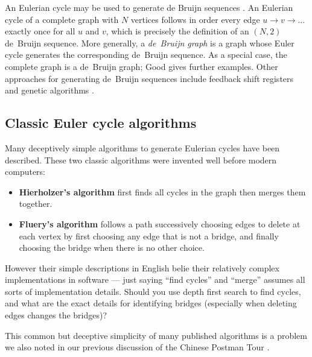 \documentclass[preprint,times]{elsarticle}
\begin{document}
An Eulerian cycle may be used to generate de Bruijn sequences \cite{fleury,hierholzer}. An Eulerian cycle of a complete graph with $N$ vertices follows in order every edge $u \rightarrow v \rightarrow\ldots$ exactly once for all $u$ and $v$, which is precisely the definition of an $(N,2)$ de~Bruijn sequence. More generally, a \emph{de~Bruijn graph\/} is a graph whose Euler cycle generates the corresponding de~Bruijn sequence. As a special case, the complete graph is a de~Bruijn graph; Good \cite{good} gives further examples. Other approaches for generating de~Bruijn sequences include feedback shift registers and genetic algorithms \cite{turan,knuth4a}.%

\subsection{Classic Euler cycle algorithms}\label{new-algorithm}
Many deceptively simple algorithms to generate Eulerian cycles have been described. These two classic algorithms were invented well before modern computers:

\begin{itemize}\raggedright
\item \textbf{Hierholzer's algorithm} \cite{hierholzer} first finds all cycles in the graph then merges them together. 
\item \textbf{Fluery's algorithm} \cite{fleury} follows a path successively choosing edges to delete at each vertex by first choosing any edge that is not a bridge, and finally choosing the bridge when there is no other choice.
\end{itemize}

However their simple descriptions in English belie their relatively complex implementations in software --- just saying ``find cycles'' and ``merge'' assumes all sorts of implementation details. Should you use depth first search to find cycles, and what are the exact details for identifying bridges (especially when deleting edges changes the bridges)? 

This common but deceptive simplicity of many published algorithms is a problem we also noted in our previous discussion of the Chinese Postman Tour \cite{cpp}. 

\end{document}
